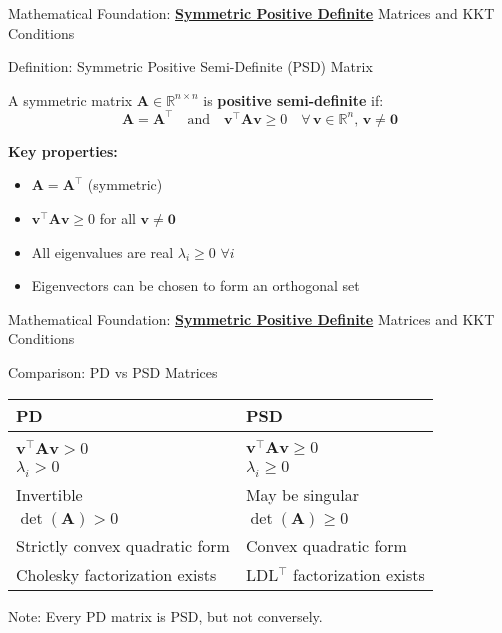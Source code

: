 \documentclass{beamer}
\begin{document}
\begin{frame}{Mathematical Foundation: \textbf{\underline{Symmetric Positive Definite}} Matrices and KKT Conditions}

\begin{block}{Definition: Symmetric Positive Semi-Definite (PSD) Matrix}

A symmetric matrix $\bm{A} \in \mathbb{R}^{n \times n}$ is \textbf{positive semi-definite} if:
\[
\bm{A} = \bm{A}^\top \quad \text{and} \quad \bm{v}^\top \bm{A} \bm{v} \geq 0 \quad \forall \, \bm{v} \in \mathbb{R}^n, \, \bm{v} \neq \bm{0}
\]

\vspace{0.3cm}

\textbf{Key properties:}
\begin{itemize}
    \item $\bm{A} = \bm{A}^\top$ (symmetric)
    \item $\bm{v}^\top \bm{A} \bm{v} \geq 0$ for all $\bm{v} \neq \bm{0}$
    \item All eigenvalues are real $\lambda_i \geq 0$ $\forall i$
    \item Eigenvectors can be chosen to form an orthogonal set
\end{itemize}

\end{block}

\end{frame}

\begin{frame}{Mathematical Foundation: \textbf{\underline{Symmetric Positive Definite}} Matrices and KKT Conditions}

\begin{alertblock}{Comparison: PD vs PSD Matrices}

\begin{tabular}{ll}
\textbf{PD} & \textbf{PSD} \\
\hline
\hfill \\
$\bm{v}^\top \bm{A} \bm{v} > 0$ & $\bm{v}^\top \bm{A} \bm{v} \geq 0$ \\
$\lambda_i > 0$ & $\lambda_i \geq 0$ \\
Invertible & May be singular \\
$\det(\bm{A}) > 0$ & $\det(\bm{A}) \geq 0$ \\
Strictly convex quadratic form & Convex quadratic form \\
Cholesky factorization exists & LDL$^\top$ factorization exists \\
\end{tabular}

\vspace{0.3cm}

Note: Every PD matrix is PSD, but not conversely.

\end{alertblock}

\end{frame}
\end{document}
